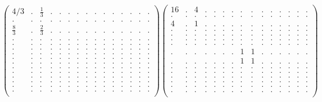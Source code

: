 \documentclass[12pt,a4paper]{amsart}
\begin{document}
\begin{align*}
\left(\begin{array}{rrrrrrrrrrrrrrr}%
4/3&.&\frac13&.&.&.&.&.&.&.&.&.&.&.&.\\%
.&.&.&.&.&.&.&.&.&.&.&.&.&.&.\\%
\frac{8}{3}&.&\frac23&.&.&.&.&.&.&.&.&.&.&.&.\\%
.&.&.&.&.&.&.&.&.&.&.&.&.&.&.\\%
.&.&.&.&.&.&.&.&.&.&.&.&.&.&.\\%
.&.&.&.&.&.&.&.&.&.&.&.&.&.&.\\%
.&.&.&.&.&.&.&.&.&.&.&.&.&.&.\\%
.&.&.&.&.&.&.&.&.&.&.&.&.&.&.\\%
.&.&.&.&.&.&.&.&.&.&.&.&.&.&.\\%
.&.&.&.&.&.&.&.&.&.&.&.&.&.&.\\%
.&.&.&.&.&.&.&.&.&.&.&.&.&.&.\\%
.&.&.&.&.&.&.&.&.&.&.&.&.&.&.\\%
.&.&.&.&.&.&.&.&.&.&.&.&.&.&.\\%
.&.&.&.&.&.&.&.&.&.&.&.&.&.&.\\%
.&.&.&.&.&.&.&.&.&.&.&.&.&.&.\\%
\end{array}\right)%
\left(\begin{array}{rrrrrrrrrrrrrrr}%
16&.&4&.&.&.&.&.&.&.&.&.&.&.&.\\%
.&.&.&.&.&.&.&.&.&.&.&.&.&.&.\\%
4&.&1&.&.&.&.&.&.&.&.&.&.&.&.\\%
.&.&.&.&.&.&.&.&.&.&.&.&.&.&.\\%
.&.&.&.&.&.&.&.&.&.&.&.&.&.&.\\%
.&.&.&.&.&.&.&.&.&.&.&.&.&.&.\\%
.&.&.&.&.&.&.&.&.&.&.&.&.&.&.\\%
.&.&.&.&.&.&.&1&1&.&.&.&.&.&.\\%
.&.&.&.&.&.&.&1&1&.&.&.&.&.&.\\%
.&.&.&.&.&.&.&.&.&.&.&.&.&.&.\\%
.&.&.&.&.&.&.&.&.&.&.&.&.&.&.\\%
.&.&.&.&.&.&.&.&.&.&.&.&.&.&.\\%
.&.&.&.&.&.&.&.&.&.&.&.&.&.&.\\%
.&.&.&.&.&.&.&.&.&.&.&.&.&.&.\\%
.&.&.&.&.&.&.&.&.&.&.&.&.&.&.\\%
\end{array}\right)%
\end{align*}
\end{document}
